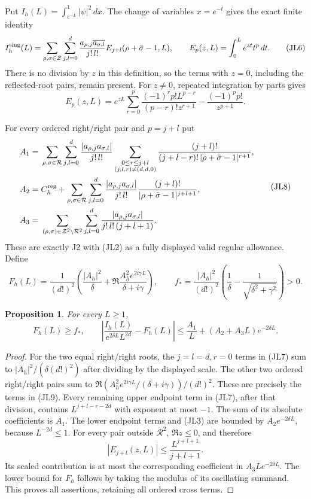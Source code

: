 \documentclass[11pt,a4paper]{article}
\newtheorem{proposition}[theorem]{Proposition}
\begin{document}
Put \(I_h(L)=\int_{e^{-L}}^1|\psi|^2\,dx\).
The change of variables \(x=e^{-t}\) gives the exact finite identity
\[
I_h^{\rm sing}(L)=
\sum_{\rho,\sigma\in\mathcal Z}\sum_{j,l=0}^d
\frac{a_{\rho,j}\overline{a_{\sigma,l}}}{j!\,l!}
E_{j+l}(\rho+\bar\sigma-1,L),\qquad
E_p(z,L)=\int_0^L e^{zt}t^p\,dt.
\tag{JL6}
\]
There is no division by \(z\) in this definition, so the terms with
\(z=0\), including the reflected-root pairs, remain present.
For \(z\ne0\), repeated integration by parts gives
\[
E_p(z,L)=e^{zL}\sum_{r=0}^p
\frac{(-1)^r p!L^{p-r}}{(p-r)!z^{r+1}}
-\frac{(-1)^p p!}{z^{p+1}}.
\tag{JL7}
\]

For every ordered right/right pair and \(p=j+l\) put
\[
\begin{split}
A_1={}&\sum_{\rho,\sigma\in\mathcal R}\sum_{j,l=0}^d
\frac{|a_{\rho,j}a_{\sigma,l}|}{j!\,l!}
\sum_{\substack{0\le r\le j+l\\(j,l,r)\ne(d,d,0)}}
\frac{(j+l)!}{(j+l-r)!\,|\rho+\bar\sigma-1|^{r+1}},\\
A_2={}&C_h^{\rm reg}+
\sum_{\rho,\sigma\in\mathcal R}\sum_{j,l=0}^d
\frac{|a_{\rho,j}a_{\sigma,l}|}{j!\,l!}
\frac{(j+l)!}{|\rho+\bar\sigma-1|^{j+l+1}},\\
A_3={}&
\sum_{(\rho,\sigma)\in\mathcal Z^2\setminus\mathcal R^2}
\sum_{j,l=0}^d
\frac{|a_{\rho,j}a_{\sigma,l}|}{j!\,l!\,(j+l+1)}.
\end{split}
\tag{JL8}
\]
These are exactly J2 with (JL2) as a fully displayed valid regular
allowance.  Define
\[
F_h(L)=\frac1{(d!)^2}
\left(\frac{|A_h|^2}{\delta}
+\Re\frac{A_h^2e^{2i\gamma L}}{\delta+i\gamma}\right),
\qquad
f_*=\frac{|A_h|^2}{(d!)^2}
\left(\frac1\delta-\frac1{\sqrt{\delta^2+\gamma^2}}\right)>0.
\tag{JL9}
\]

\begin{proposition}
For every \(L\ge1\),
\[
F_h(L)\ge f_*,
\qquad
\left|\frac{I_h(L)}{e^{2\delta L}L^{2d}}-F_h(L)\right|
\le \frac{A_1}{L}+(A_2+A_3L)e^{-2\delta L}.
\tag{JL10}
\]
\end{proposition}
\begin{proof}
For the two equal right/right roots, the \(j=l=d,r=0\) terms in
(JL7) sum to
\(|A_h|^2/(\delta(d!)^2)\) after dividing by the displayed scale.
The other two ordered right/right pairs sum to
\(\Re(A_h^2e^{2i\gamma L}/(\delta+i\gamma))/(d!)^2\).
These are precisely the terms in (JL9).
Every remaining upper endpoint term in (JL7), after that division,
contains \(L^{j+l-r-2d}\) with exponent at most \(-1\).
The sum of its absolute coefficients is \(A_1\).
The lower endpoint terms and (JL3) are bounded by
\(A_2e^{-2\delta L}\), because \(L^{-2d}\le1\).
For every pair outside \(\mathcal R^2\), \(\Re z\le0\), and therefore
\[
|E_{j+l}(z,L)|\le \frac{L^{j+l+1}}{j+l+1}.
\]
Its scaled contribution is at most the corresponding coefficient in
\(A_3Le^{-2\delta L}\).
The lower bound for \(F_h\) follows by taking the modulus of its
oscillating summand.  This proves all assertions, retaining all ordered
cross terms.
\end{proof}
\end{document}
